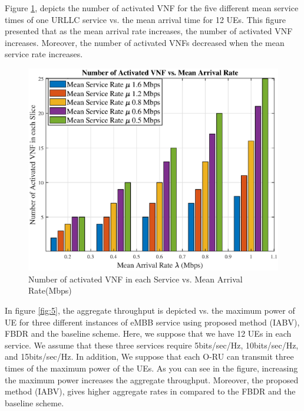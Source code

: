 \documentclass[conference]{IEEEtran}
\begin{document}
Figure \ref{fig:4}, depicts the number of activated VNF for the five different mean service times of one URLLC service vs. the mean arrival time for 12 UEs. This figure presented that as the mean arrival rate increases, the number of activated VNF increases. Moreover, the number of activated VNFs decreased when the mean service rate increases.


\begin{figure}
  \centering 
    \includegraphics[scale = 0.47]{vnfNum1.eps}
  \caption{Number of activated VNF in each Service vs. Mean Arrival Rate(Mbps)}
  \label{fig:4}
\end{figure}

In figure \ref{fig:5}, the aggregate throughput is depicted vs. the maximum power of UE for three different instances of eMBB service using proposed method (IABV), FBDR and the baseline scheme. Here, we suppose that we have 12 UEs in each service.  We assume that these three services require 5bits/sec/Hz, 10bits/sec/Hz, and 15bits/sec/Hz.
In addition, We suppose that each O-RU can transmit three times of the maximum power of the UEs. As you can see in the figure, increasing the maximum power increases the aggregate throughput. Moreover, the proposed method (IABV), gives higher aggregate rates in compared to the FBDR and the baseline scheme.  
\end{document}
